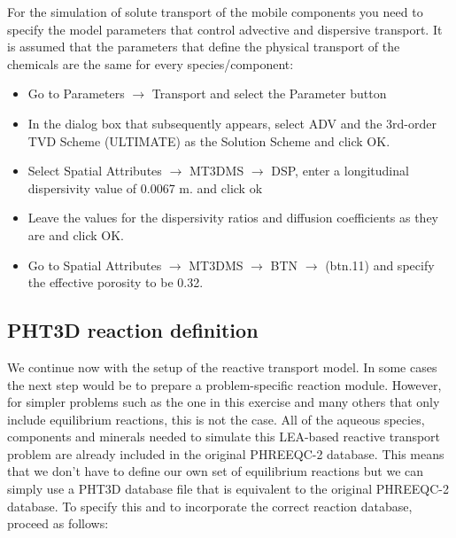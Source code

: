 For the simulation of solute transport of the mobile components you need to specify the model parameters that control advective and dispersive transport. It is assumed that the parameters that define the physical transport of the chemicals are the same for every species/component:

\begin{itemize}

\item Go to {\color{blue}Parameters} $\rightarrow$ {\color{blue}Transport} and select the {\color{blue}Parameter} button

\item In the dialog box that subsequently appears, select {\color{blue}ADV} and the 
{\color{blue}3rd-order TVD Scheme (ULTIMATE)} as the Solution Scheme and click {\color{blue}OK}.

\item Select {\color{blue}Spatial Attributes} $\rightarrow$ {\color{blue}MT3DMS} $\rightarrow$ {\color{blue}DSP}, enter a longitudinal dispersivity value of 0.0067 m. and click {\color{blue}ok}

\item Leave the values for the dispersivity ratios and diffusion coefficients as they are and click {\color{blue}OK}.

\item Go to {\color{blue}Spatial Attributes} $\rightarrow$ 
{\color{blue}MT3DMS} $\rightarrow$ {\color{blue}BTN} $\rightarrow$ (\color{blue}btn.11)
and specify the effective porosity to be 0.32.

\end{itemize}



\subsection[PHT3D reaction definition]{PHT3D reaction definition}

We continue now with the setup of the reactive transport model. In some cases
the next step would be to prepare a problem-specific reaction module.   
However, for simpler problems such as the one in this exercise and many others
that only include equilibrium reactions, this is not the case. 
All of the aqueous species, components and minerals needed to
simulate this LEA-based reactive transport problem are already
included in the original PHREEQC-2 database. 
This means that we don't have to define our own set of equilibrium reactions 
but we can simply use a PHT3D database file that is equivalent to
the original PHREEQC-2 database. 
To specify this and to incorporate the correct reaction database, 
proceed as follows:

